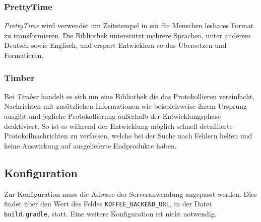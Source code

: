 \subsubsection{PrettyTime}
\label{subsubsec:app:bibs:prettytime}
\textit{PrettyTime} wird verwendet um Zeitstempel in ein für Menschen lesbares Format zu transformieren.
Die Bibliothek unterstützt mehrere Sprachen, unter anderem Deutsch sowie Englisch, und erspart Entwicklern so das Übersetzen und Formatieren.

\subsubsection{Timber}
\label{subsubsec:app:bibs:timber}
Bei \textit{Timber} handelt es sich um eine Bibliothek die das Protokollieren vereinfacht, Nachrichten mit zusätzlichen Informationen wie beispielsweise ihrem Ursprung ausgibt und jegliche Protokollierung außerhalb der Entwicklungsphase deaktiviert.
So ist es während der Entwicklung möglich schnell detaillierte Protokollnachrichten zu verfassen, welche bei der Suche nach Fehlern helfen und keine Auswirkung auf ausgelieferte Endprodukte haben.

\subsection{Konfiguration}
\label{subsec:app:configuration}
Zur Konfiguration muss die Adresse der Serveranwendung angepasst werden.
Dies findet über den Wert des Feldes \verb|KOFFEE_BACKEND_URL|, in der Datei \verb|build.gradle|, statt.
Eine weitere Konfiguration ist nicht notwendig.
